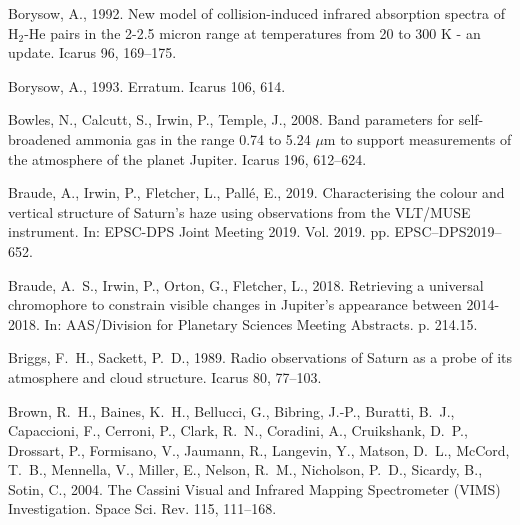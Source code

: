 \documentclass[article,11pt]{emulateapj}
\begin{document}
\begin{thebibliography}{85}
{Borysow}, A., 1992. {New model of collision-induced infrared absorption
  spectra of H$_2$-He pairs in the 2-2.5 micron range at temperatures from 20
  to 300 K - an update}. Icarus 96, 169--175.

{Borysow}, A., 1993. {Erratum}. Icarus 106, 614.

{Bowles}, N., {Calcutt}, S., {Irwin}, P., {Temple}, J., 2008. {Band parameters
  for self-broadened ammonia gas in the range 0.74 to 5.24 {$\mu$}m to support
  measurements of the atmosphere of the planet Jupiter}. Icarus 196, 612--624.

{Braude}, A., {Irwin}, P., {Fletcher}, L., {Pall{\'e}}, E., 2019.
  {Characterising the colour and vertical structure of Saturn's haze using
  observations from the VLT/MUSE instrument}. In: EPSC-DPS Joint Meeting 2019.
  Vol. 2019. pp. EPSC--DPS2019--652.

{Braude}, A.~S., {Irwin}, P., {Orton}, G., {Fletcher}, L., 2018. {Retrieving a
  universal chromophore to constrain visible changes in Jupiter's appearance
  between 2014-2018}. In: AAS/Division for Planetary Sciences Meeting
  Abstracts. p. 214.15.

{Briggs}, F.~H., {Sackett}, P.~D., 1989. {Radio observations of Saturn as a
  probe of its atmosphere and cloud structure}. Icarus 80, 77--103.

{Brown}, R.~H., {Baines}, K.~H., {Bellucci}, G., {Bibring}, J.-P., {Buratti},
  B.~J., {Capaccioni}, F., {Cerroni}, P., {Clark}, R.~N., {Coradini}, A.,
  {Cruikshank}, D.~P., {Drossart}, P., {Formisano}, V., {Jaumann}, R.,
  {Langevin}, Y., {Matson}, D.~L., {McCord}, T.~B., {Mennella}, V., {Miller},
  E., {Nelson}, R.~M., {Nicholson}, P.~D., {Sicardy}, B., {Sotin}, C., 2004.
  {The Cassini Visual and Infrared Mapping Spectrometer (VIMS) Investigation}.
  Space Sci. Rev. 115, 111--168.


\end{thebibliography}
\end{document}
